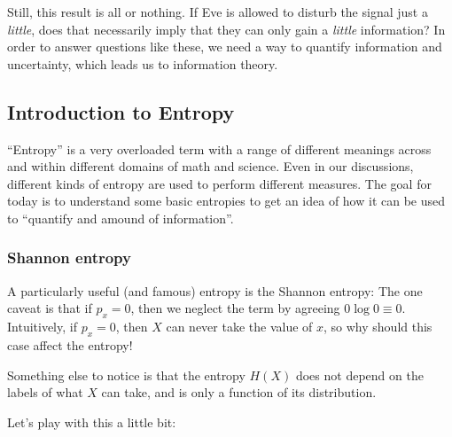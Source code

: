 \documentclass[a4paper,12pt]{article}
\begin{document}
Still, this result is all or nothing.
If Eve is allowed to disturb the signal just a \emph{little}, does that necessarily imply that they can only gain a \emph{little} information?
In order to answer questions like these, we need a way to quantify information and uncertainty, which leads us to information theory.

\subsection{Introduction to Entropy}

``Entropy'' is a very overloaded term with a range of different meanings across and within different domains of math and science.
Even in our discussions, different kinds of entropy are used to perform different measures.
The goal for today is to understand some basic entropies to get an idea of how it can be used to ``quantify and amound of information''.

\subsubsection{Shannon entropy}

A particularly useful (and famous) entropy is the Shannon entropy:
The one caveat is that if $p_x=0$, then we neglect the term by agreeing $0\log 0 \equiv 0$. Intuitively, if $p_x=0$, then $X$ can never take the value of $x$, so why should this case affect the entropy!

Something else to notice is that the entropy $H(X)$ does not depend on the labels of what $X$ can take, and is only a function of its distribution.

Let's play with this a little bit:
\end{document}
